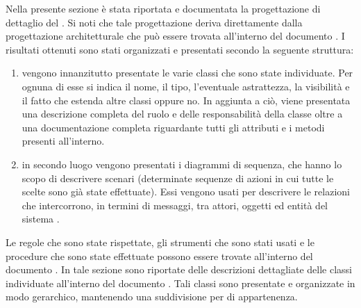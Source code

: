         Nella presente sezione è stata riportata e documentata la progettazione di dettaglio del  . Si noti che tale progettazione deriva direttamente dalla progettazione architetturale che può essere trovata all'interno del documento . I risultati ottenuti sono stati organizzati e presentati secondo la seguente struttura:
        \begin{enumerate}
            \item vengono innanzitutto presentate le varie classi che sono state individuate. Per ognuna di esse si indica il nome, il tipo, l'eventuale astrattezza, la visibilità e il fatto che estenda altre classi oppure no. In aggiunta a ciò, viene presentata una descrizione completa del ruolo e delle responsabilità della classe oltre a una documentazione completa riguardante tutti gli attributi e i metodi presenti all'interno.
            \item in secondo luogo vengono presentati i diagrammi di sequenza, che hanno lo scopo di descrivere scenari (determinate sequenze di azioni in cui tutte le scelte sono già state effettuate). Essi vengono usati per descrivere le relazioni che intercorrono, in termini di messaggi, tra attori, oggetti ed entità del sistema .
        \end{enumerate}
        Le regole che sono state rispettate, gli strumenti che sono stati usati e le procedure che sono state effettuate possono essere trovate all'interno del documento .
            In tale sezione sono riportate delle descrizioni dettagliate delle classi individuate all'interno del documento . Tali classi sono presentate e organizzate in modo gerarchico, mantenendo una suddivisione per  di appartenenza.
            

